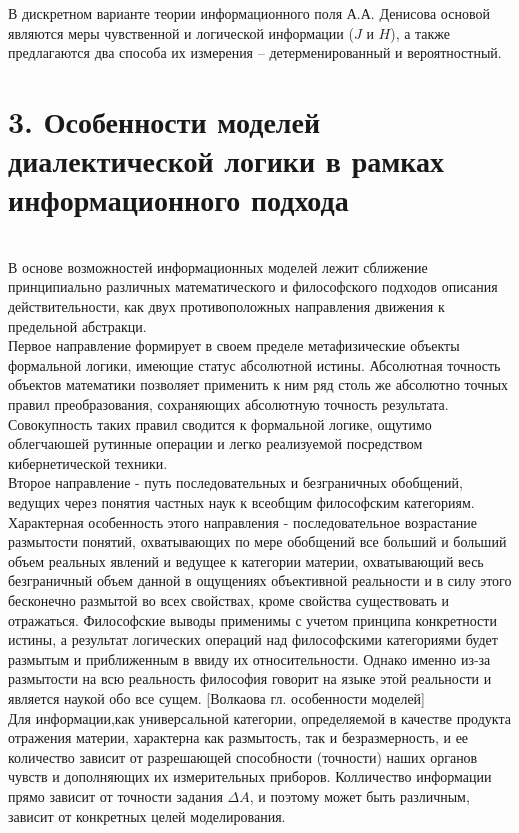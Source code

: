 \documentclass[a4paper,12pt]{report}
\begin{document}
	В дискретном варианте теории информационного поля А.А. Денисова основой являются меры чувственной и логической информации ($J$ и $H$), а также предлагаются два способа их измерения – детерменированный и вероятностный.



\chapter*{3. Особенности моделей диалектической логики в рамках информационного подхода }
 \\



В основе возможностей информационных моделей лежит сближение  принципиально различных математического и философского подходов описания действительности, как двух противоположных направления движения к предельной абстракци.\\ Первое направление формирует в своем пределе метафизические объекты формальной логики, имеющие статус абсолютной истины. Абсолютная точность объектов математики позволяет применить к ним ряд столь же абсолютно точных правил преобразования, сохраняющих абсолютную точность результата. Совокупность таких правил сводится к формальной логике, ощутимо облегчаюшей рутинные операции и легко реализуемой посредством кибернетической техники.\\
 Второе направление - путь последовательных и безграничных обобщений, ведущих через понятия частных наук к всеобщим философским категориям. Характерная особенность этого направления - последовательное возрастание размытости понятий, охватывающих по мере обобщений все больший и больший объем реальных явлений и ведущее к категории материи, охватывающий весь безграничный объем данной в ощущениях объективной реальности и в силу этого бесконечно размытой во всех свойствах, кроме свойства существовать и отражаться. Философские выводы применимы с учетом принципа конкретности истины, а результат логических операций над философскими категориями будет размытым и приближенным в ввиду их относительности. Однако именно из-за размытости на всю реальность философия говорит на языке этой реальности и является наукой обо все сущем. [Волкаова гл. особенности моделей]\\ 
 Для информации,как универсальной категории, определяемой в качестве продукта отражения материи, характерна как размытость, так и безразмерность, и ее количество зависит от разрешающей способности (точности) наших органов чувств и дополняющих их измерительных приборов. Колличество информации прямо зависит от точности задания $\Delta A$, и поэтому может быть различным, зависит от конкретных целей моделирования.\\
\end{document}
